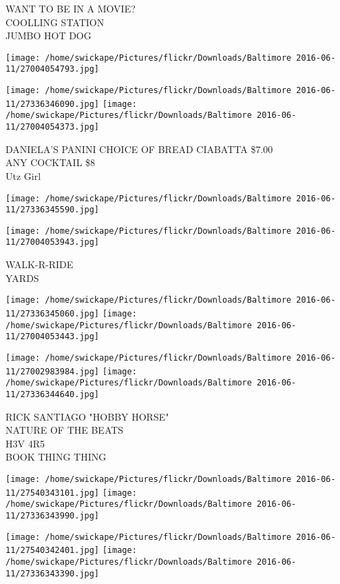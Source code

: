 \documentclass[10pt,letterpaper]{article}
\begin{document}
WANT TO BE IN A MOVIE?\\
COOLLING STATION\\
JUMBO HOT DOG
\pagebreak

\texttt{[image: /home/swickape/Pictures/flickr/Downloads/Baltimore 2016-06-11/27004054793.jpg]}

\vspace{0.25in}
\texttt{[image: /home/swickape/Pictures/flickr/Downloads/Baltimore 2016-06-11/27336346090.jpg]}
\texttt{[image: /home/swickape/Pictures/flickr/Downloads/Baltimore 2016-06-11/27004054373.jpg]}

DANIELA'S PANINI CHOICE OF BREAD CIABATTA \$7.00\\
ANY COCKTAIL \$8\\
Utz Girl
\pagebreak

\texttt{[image: /home/swickape/Pictures/flickr/Downloads/Baltimore 2016-06-11/27336345590.jpg]}

\vspace{0.25in}
\texttt{[image: /home/swickape/Pictures/flickr/Downloads/Baltimore 2016-06-11/27004053943.jpg]}

WALK{-}R{-}RIDE\\
YARDS
\pagebreak

\texttt{[image: /home/swickape/Pictures/flickr/Downloads/Baltimore 2016-06-11/27336345060.jpg]}
\texttt{[image: /home/swickape/Pictures/flickr/Downloads/Baltimore 2016-06-11/27004053443.jpg]}

\texttt{[image: /home/swickape/Pictures/flickr/Downloads/Baltimore 2016-06-11/27002983984.jpg]}
\texttt{[image: /home/swickape/Pictures/flickr/Downloads/Baltimore 2016-06-11/27336344640.jpg]}

RICK SANTIAGO "HOBBY HORSE"\\
NATURE OF THE BEATS\\
H3V 4R5\\
BOOK THING THING
\pagebreak

\texttt{[image: /home/swickape/Pictures/flickr/Downloads/Baltimore 2016-06-11/27540343101.jpg]}
\texttt{[image: /home/swickape/Pictures/flickr/Downloads/Baltimore 2016-06-11/27336343990.jpg]}

\texttt{[image: /home/swickape/Pictures/flickr/Downloads/Baltimore 2016-06-11/27540342401.jpg]}
\texttt{[image: /home/swickape/Pictures/flickr/Downloads/Baltimore 2016-06-11/27336343390.jpg]}
\end{document}
